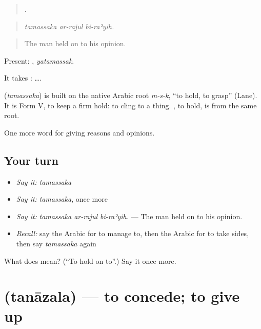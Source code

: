 \begin{quote}
  .
\end{quote}

\begin{quote}
\emph{tamassaka ar-rajul bi-raʾyih.}
\end{quote}

\begin{quote}
The man held on to his opinion.
\end{quote}

Present: , \emph{yatamassak}.

It takes :   ….

\begin{cousinweb}
\textbf{} (\emph{tamassaka}) is built on the native Arabic root \emph{m-s-k}, \textquotedblleft{}to hold, to grasp\textquotedblright{} (Lane). It is Form V, to keep a firm hold: to cling to a thing. , to hold, is from the same root.
\end{cousinweb}

\begin{grammarlens}[title={What you've built}]
One more word for giving reasons and opinions.
\end{grammarlens}

\subsection*{Your turn}
\begin{itemize}
\raggedright
  \item \emph{Say it:} \emph{tamassaka}
  \item \emph{Say it:} \emph{tamassaka}, once more
  \item \emph{Say it:} \emph{tamassaka ar-rajul bi-raʾyih.} — The man held on to his opinion.
  \item \emph{Recall:} say the Arabic for to manage to, then the Arabic for to take sides, then say \emph{tamassaka} again
\end{itemize}

\begin{tcolorbox}[breakable,colback=teal!4,colframe=teal!35!black,title={Before you move on}]
What does  mean? (\textquotedblleft{}To hold on to\textquotedblright{}.) Say it once more.
\end{tcolorbox}
\section[\texorpdfstring{\ar{تنازل} (tanāzala)}{تنازل (tanāzala)}]{ (tanāzala) — to concede; to give up}


